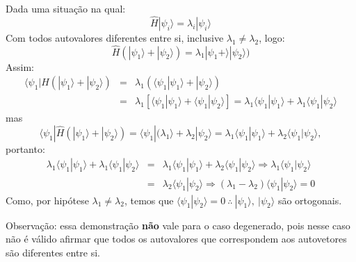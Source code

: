 \begin{enumerate}[start=1,label={\bfseries Q\arabic*.}]
\resposta Dada uma situação na qual:
%
\begin{equation}
  \hat{H} | \psi_{i} \rangle = \lambda_{i} | \psi_{i} \rangle
\end{equation}
%
Com todos autovalores diferentes entre si, inclusive $\lambda_{1} \neq \lambda_{2}$, logo:
\begin{equation}
  \hat{H} ( | \psi_{1} \rangle + | \psi_{2} \rangle ) =  \lambda_{1} | \psi_{1} + \rangle | \psi_{2} \rangle )
\end{equation}
%
Assim:
%
\begin{equation}
\begin{array}{ccl}
  \langle \psi_{1} | H (| \psi_{1} \rangle + | \psi_{2} \rangle) & = & \lambda_{1} ( \langle \psi_{1} | \psi_{1} \rangle + | \psi_{2} \rangle ) \\
  & = & \lambda_{1} [ \langle \psi_{1} | \psi_{1} \rangle + \langle \psi_{1} | \psi_{2} \rangle ] = \lambda_{1} \langle \psi_{1} | \psi_{1} \rangle + \lambda_{1} \langle \psi_{1} | \psi_{2} \rangle
\end{array}
\end{equation}
%
mas
%
\begin{equation}
\langle \psi_{1} | \hat{H} ( | \psi_{1} \rangle + | \psi_{2} \rangle ) =  \langle \psi_{1} | ( \lambda_{1} \rangle + \lambda_{2} | \psi_{2} \rangle = \lambda_{1} \langle \psi_{1} | \psi_{1} \rangle + \lambda_{2} \langle \psi_{1} | \psi_{2} \rangle ,
\end{equation}
%
portanto:
%
\begin{equation}
\begin{array}{ccl}
  \lambda_{1} \langle \psi_{1} | \psi_{1} \rangle + \lambda_{1} \langle \psi_{1} | \psi_{2} \rangle & = & \lambda_{1} \langle \psi_{1} | \psi_{1} \rangle + \lambda_{2} \langle \psi_{1} | \psi_{2} \rangle \Rightarrow \lambda_{1} \langle \psi_{1} | \psi_{2} \rangle \\
  & = & \lambda_{2} \langle \psi_{1} | \psi_{2} \rangle \Rightarrow (\lambda_{1} - \lambda_{2}) \langle \psi_{1} | \psi_{2} \rangle = 0
\end{array}
\end{equation}
%
Como, por hipótese $ \lambda_{1} \neq \lambda_{2} $, temos que $\langle \psi_{1} | \psi_{2} \rangle = 0 \ \therefore \ | \psi_{1} \rangle, \  |\psi_{2} \rangle $ são ortogonais.

Observação: essa demonstração \textbf{não} vale para o caso degenerado, pois nesse caso não é válido afirmar que todos os autovalores que correspondem aos autovetores são diferentes entre si.






\end{enumerate}
